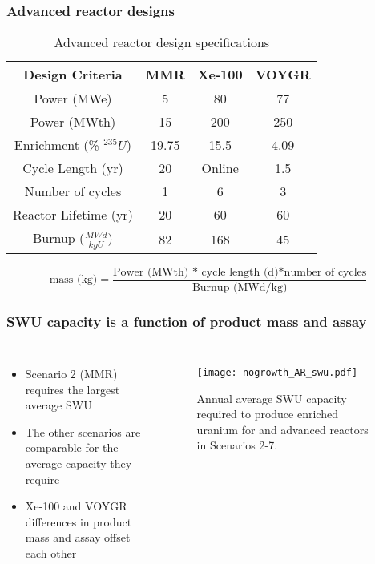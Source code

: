 \begin{frame}
    \frametitle{Advanced reactor designs}
    \begingroup
        \renewcommand{\arraystretch}{1.5}
        \begin{table}
            \small
            \caption{Advanced reactor design specifications}
            \label{tab:reactor_summary}
            \begin{tabular}{ c c c c }
                \hline
                Design Criteria & MMR 
                    \cite{noauthor_usnc_2021} & 
                    Xe-100 \cite{mulder_overview_2021} & 
                    VOYGR \cite{nuscale_chapter_2020-1,reyes_nuscale_2021,reyes_correction_2022}\\\hline
                Power (MWe) & 5 & 80 & 77\\
                Power (MWth) & 15 & 200 & 250\\
                Enrichment (\% $^{235}U$) & 19.75 & 15.5 & 4.09 \\
                Cycle Length (yr) & 20 & Online & 1.5 \\
                Number of cycles & 1 & 6 & 3\\
                Reactor Lifetime (yr) & 20 & 60 & 60\\
                Burnup ($\frac{MWd}{kg U}$) & 82 & 168 & 45\\
                \hline
            \end{tabular}
        \end{table}   
    \endgroup
    \begin{equation*}
        \text{mass (kg)} = \frac{\text{Power (MWth) * cycle length (d)*number of cycles}}{\text{Burnup (MWd/kg)}}
        \label{eq:fuel_mass}
    \end{equation*}
\end{frame}

\begin{frame}
    \frametitle{\gls{SWU} capacity is a function of product mass and assay}
    \begin{columns}
        \column[t]{4.3cm}
            \begin{itemize}
                \item Scenario 2 (MMR) requires the largest average \gls{SWU} 
                \item The other scenarios are comparable for the average 
                      capacity they require
                \item Xe-100 and VOYGR differences in product mass and assay 
                      offset each other
                
            \end{itemize}
        \column[t]{6.3cm}
        \vspace{-1cm}
        \begin{figure}
                \centering
                \texttt{[image: nogrowth\_AR\_swu.pdf]}
                \caption{Annual average \gls{SWU} capacity required to produce 
                enriched uranium for and advanced reactors in Scenarios 2-7.}
                \label{fig:ot_swu}
        \end{figure}
    \end{columns}
\end{frame}
